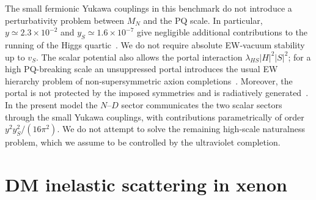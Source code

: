 \documentclass[aps,prd,reprint,preprintnumbers,superscriptaddress,nofootinbib,floatfix]{revtex4-2}
\begin{document}
The small fermionic Yukawa couplings in this benchmark do not introduce a perturbativity problem between $M_N$ and the PQ scale. In particular, $y\simeq2.3\times10^{-2}$ and $y_S\simeq1.6\times10^{-7}$ give negligible additional contributions to the running of the Higgs quartic~\cite{Abe:2019wku, Wang:2018lhk, Cheng:2019qbd}. We do not require absolute EW-vacuum stability up to $v_S$. The scalar potential also allows the portal interaction $\lambda_{HS}|H|^2|S|^2$; for a high PQ-breaking scale an unsuppressed portal introduces the usual EW hierarchy problem of non-supersymmetric axion completions~\cite{Allison:2014hna, Blasi:2024mtc}. Moreover, the portal is not protected by the imposed symmetries and is radiatively generated~\cite{Blasi:2024mtc}. In the present model the $N$--$D$ sector communicates the two scalar sectors through the small Yukawa couplings, with contributions parametrically of order $y^2y_S^2/(16\pi^2)$. We do not attempt to solve the remaining high-scale naturalness problem, which we assume to be controlled by the ultraviolet completion.

\section{DM inelastic scattering in xenon}
\label{sec:dd}
\end{document}
